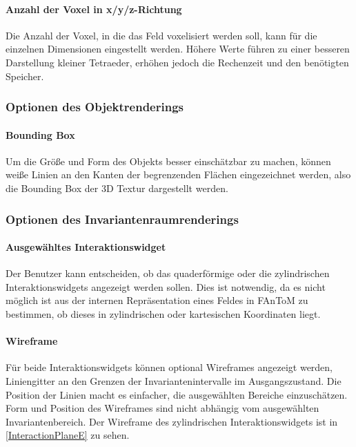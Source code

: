 \documentclass[a4paper,fontsize=12pt,toc=bib,parskip=half,ngerman]{scrartcl}
\begin{document}
\paragraph{Anzahl der Voxel in x/y/z-Richtung}
Die Anzahl der Voxel, in die das Feld voxelisiert werden soll, kann f\"ur die einzelnen Dimensionen eingestellt werden. H\"ohere Werte f\"uhren zu einer besseren Darstellung kleiner Tetraeder, erh\"ohen jedoch die Rechenzeit und den ben\"otigten Speicher.

\subsubsection{Optionen des Objektrenderings}

\paragraph{Bounding Box}
Um die Gr\"o{\ss}e und Form des Objekts besser einsch\"atzbar zu machen, k\"onnen wei{\ss}e Linien an den Kanten der begrenzenden Fl\"achen eingezeichnet werden, also die Bounding Box der 3D Textur dargestellt werden.

\subsubsection{Optionen des Invariantenraumrenderings}
\label{sec:Options}

\paragraph{Ausgew\"ahltes Interaktionswidget}
Der Benutzer kann entscheiden, ob das quaderf\"ormige oder die zylindrischen Interaktionswidgets angezeigt werden sollen. Dies ist notwendig, da es nicht m\"oglich ist aus der internen Repr\"asentation eines Feldes in FAnToM zu bestimmen, ob dieses in zylindrischen oder kartesischen Koordinaten liegt.

\paragraph{Wireframe}
F\"ur beide Interaktionswidgets k\"onnen optional Wireframes angezeigt werden, Liniengitter an den Grenzen der Invariantenintervalle im Ausgangszustand. Die Position der Linien macht es einfacher, die ausgew\"ahlten Bereiche einzusch\"atzen. Form und Position des Wireframes sind nicht abh\"angig vom ausgew\"ahlten Invariantenbereich. Der Wireframe des zylindrischen Interaktionswidgets ist in \cref{InteractionPlaneE} zu sehen.
\end{document}
